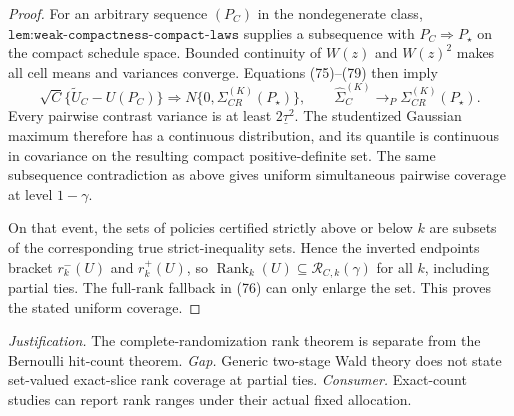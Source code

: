 \documentclass{article}
\begin{document}
\begin{proof}
For an arbitrary sequence \((P_C)\) in the nondegenerate class, \(\texttt{lem:weak-compactness-compact-laws}\) supplies a subsequence with \(P_C\Rightarrow P_\star\) on the compact schedule space.  Bounded continuity of \(W(z)\) and \(W(z)^2\) makes all cell means and variances converge.  Equations (75)--(79) then imply
\[
\sqrt C\{\widetilde U_C-U(P_C)\}\Rightarrow
N\{0,\Sigma_{CR}^{(K)}(P_\star)\},\qquad
\widehat\Sigma_C^{(K)}\to_P\Sigma_{CR}^{(K)}(P_\star). \tag{80}
\]
Every pairwise contrast variance is at least \(2\underline\tau^2\).  The studentized Gaussian maximum therefore has a continuous distribution, and its quantile is continuous in covariance on the resulting compact positive-definite set.  The same subsequence contradiction as above gives uniform simultaneous pairwise coverage at level \(1-\gamma\).

On that event, the sets of policies certified strictly above or below \(k\) are subsets of the corresponding true strict-inequality sets.  Hence the inverted endpoints bracket \(r_k^-(U)\) and \(r_k^+(U)\), so \(\operatorname{Rank}_k(U)\subseteq\mathcal R_{C,k}(\gamma)\) for all \(k\), including partial ties.  The full-rank fallback in (76) can only enlarge the set.  This proves the stated uniform coverage.
\end{proof}
\par\smallskip\noindent \textit{Justification.} The complete-randomization rank theorem is separate from the Bernoulli hit-count theorem. \textit{Gap.} Generic two-stage Wald theory does not state set-valued exact-slice rank coverage at partial ties. \textit{Consumer.} Exact-count studies can report rank ranges under their actual fixed allocation.
\end{document}
